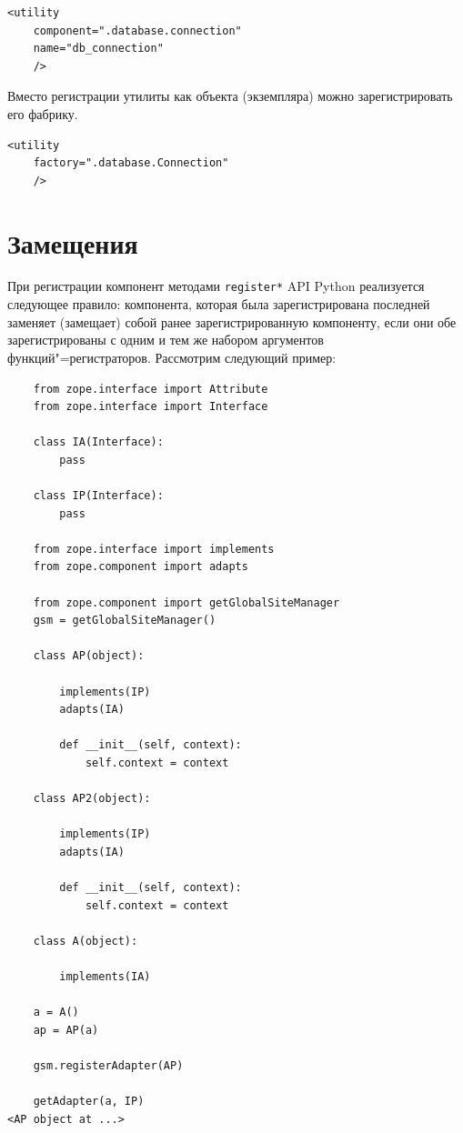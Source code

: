 \documentclass[a4paper,openany,twoside,draft]{book}
\begin{document}
\begin{verbatim}
<utility
    component=".database.connection"
    name="db_connection"
    />
\end{verbatim}

Вместо регистрации утилиты как объекта (экземпляра) можно зарегистрировать его фабрику.

\begin{verbatim}
<utility
    factory=".database.Connection"
    />
\end{verbatim}


\section{Замещения%
  \label{id48}%
}

При регистрации компонент методами \texttt{register*} API Python реализуется следующее правило: компонента, которая была зарегистрирована последней заменяет (замещает) собой ранее зарегистрированную компоненту, если они обе зарегистрированы с одним и тем же набором аргументов функций"=регистраторов.  Рассмотрим следующий пример:

\begin{verbatim}
    from zope.interface import Attribute
    from zope.interface import Interface

    class IA(Interface):
        pass

    class IP(Interface):
        pass

    from zope.interface import implements
    from zope.component import adapts

    from zope.component import getGlobalSiteManager
    gsm = getGlobalSiteManager()

    class AP(object):

        implements(IP)
        adapts(IA)

        def __init__(self, context):
            self.context = context

    class AP2(object):

        implements(IP)
        adapts(IA)

        def __init__(self, context):
            self.context = context

    class A(object):

        implements(IA)

    a = A()
    ap = AP(a)

    gsm.registerAdapter(AP)

    getAdapter(a, IP)
<AP object at ...>
\end{verbatim}
\end{document}
